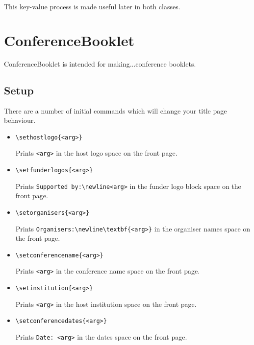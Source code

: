 \documentclass{amsart}
\begin{document}
This key-value process is made useful later in both classes.

\section{ConferenceBooklet}
ConferenceBooklet is intended for making...conference booklets.
\subsection{Setup}
There are a number of initial commands which will change your title page behaviour.
\begin{itemize}
    \item \verb|\sethostlogo{<arg>}|

    Prints \verb|<arg>| in the host logo space on the front page.
    \item \verb|\setfunderlogos{<arg>}|

    Prints \verb|Supported by:\newline<arg>| in the funder logo block space on the front page.
    \item \verb|\setorganisers{<arg>}|

    Prints \verb|Organisers:\newline\textbf{<arg>}| in the organiser names space on the front page.
    \item \verb|\setconferencename{<arg>}|

    Prints \verb|<arg>| in the conference name space on the front page.
    \item \verb|\setinstitution{<arg>}|

    Prints \verb|<arg>| in the host institution space on the front page.
    \item \verb|\setconferencedates{<arg>}|

    Prints \verb|Date: <arg>| in the dates space on the front page.
\end{itemize}
\end{document}
